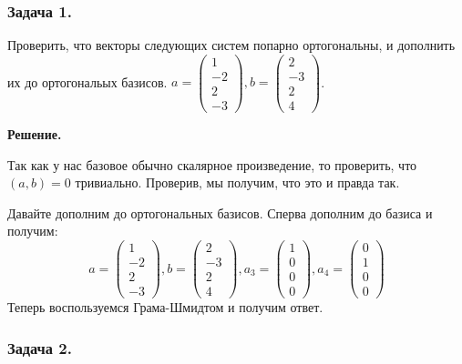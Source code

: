 \subsubsection{Задача 1.}

Проверить, что векторы следующих систем попарно ортогональны, и дополнить их до ортогональых базисов. $a = \begin{pmatrix}
    1 \\
    -2 \\
    2 \\
    -3
\end{pmatrix}, b =\begin{pmatrix}
    2 \\
    -3\\
    2 \\
    4
\end{pmatrix}$. 

\textbf{Решение.}

Так как у нас базовое обычно скалярное произведение, то проверить, что $(a,b) = 0$ тривиально. Проверив, мы получим, что это и правда так.

Давайте дополним до ортогональных базисов. Сперва дополним до базиса и получим:
$$a = \begin{pmatrix}
    1 \\
    -2 \\
    2 \\
    -3
\end{pmatrix}, b =\begin{pmatrix}
    2 \\
    -3\\
    2 \\
    4
\end{pmatrix}, a_3 = \begin{pmatrix}
    1 \\
    0\\
    0 \\
    0\end{pmatrix}, a_4 = \begin{pmatrix}
    0 \\
    1\\
    0 \\
    0\end{pmatrix} $$
Теперь воспользуемся Грама-Шмидтом и получим ответ.

\subsubsection{Задача 2.}

